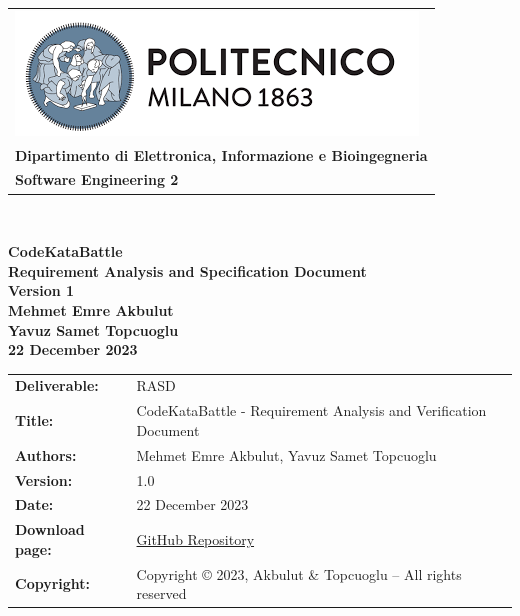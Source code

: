 \documentclass [11pt,twoside]{article}
\begin{document}

\begin{titlepage}



\begin{table}[t!]
\centering
\begin{tabu} to \textwidth { X[c] }
\includegraphics[scale=0.5]{Images/PolimiLogo} \\
\textbf{\small{Dipartimento di Elettronica, Informazione e Bioingegneria}} \\ 
\textbf{\small{Software Engineering 2}} \\
\end{tabu}
\end{table} ~
\\ [4cm]


\begin{center}
{\textbf{\Huge{CodeKataBattle}}} \\ 
\vspace{2mm}
{\textbf{\small{Requirement Analysis and Specification Document}}} \\ 
{\textbf{\footnotesize{Version 1}}} \\ [4cm]
\textbf{\small{Mehmet Emre Akbulut}} \\
\vspace{1mm}
\textbf{\small{Yavuz Samet Topcuoglu}} \\ [1cm]
\textbf{\footnotesize{22 December 2023}}
\end{center}





\end{titlepage}

\begin{table}[h!]
\begin{tabu} to \textwidth { X[0.3,r,p] X[0.7,l,p] }
\hline

\textbf{Deliverable:} & RASD\\
\textbf{Title:} & CodeKataBattle - Requirement Analysis and Verification Document \\
\textbf{Authors:} & Mehmet Emre Akbulut, Yavuz Samet Topcuoglu \\
\textbf{Version:} & 1.0 \\ 
\textbf{Date:} & 22 December 2023 \\
\textbf{Download page:} & \href{https://github.com/mehmetemreakbulut/AkbulutTopcuoglu}{GitHub Repository} \\
\textbf{Copyright:} & Copyright © 2023, Akbulut \& Topcuoglu – All rights reserved \\
\hline
\end{tabu}
\end{table}
\end{document}
